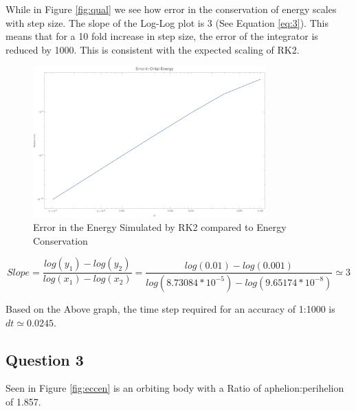 \documentclass{article}
\begin{document}
While in Figure \ref{fig:qual} we see how error in the conservation of energy scales with step size. The slope of the Log-Log plot is 3 (See Equation \ref{eq:3}).
This means that for a 10 fold increase in step size, the error of the integrator is reduced by 1000. This is consistent with the expected scaling of RK2.

\begin{figure}[!htb]
	\begin{center}
		\includegraphics[width=0.8\textwidth]{error.pdf}
	\end{center}
	\caption{Error in the Energy Simulated by RK2 compared to Energy Conservation}
\label{fig:error}
\end{figure}
\FloatBarrier


\begin{equation}\label{eq:3}
	Slope = \frac{log(y_1)-log(y_2)}{log(x_1)-log(x_2)}=\frac{log(0.01)-log(0.001)}{log(8.73084*10^{-5})-log(9.65174*10^{-8})} \simeq 3
\end{equation}

Based on the Above graph, the time step required for an accuracy of 1:1000 is $dt \simeq 0.0245$.


\pagebreak
\subsection{Question 3}

Seen in Figure \ref{fig:eccen} is an orbiting body with a Ratio of aphelion:perihelion of 1.857.
\end{document}
